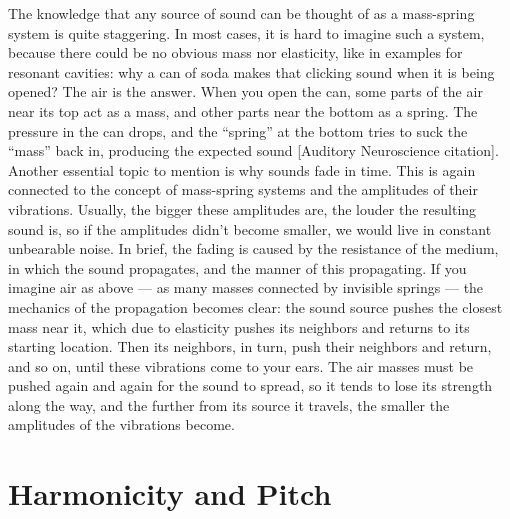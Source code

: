 The knowledge that any source of sound can be thought of as a mass-spring system is quite staggering. In most cases, it is hard to imagine such a system, because there could be no obvious mass nor elasticity, like in examples for resonant cavities: why a can of soda makes that clicking sound when it is being opened? The air is the answer. When you open the can, some parts of the air near its top act as a mass, and other parts near the bottom as a spring. The pressure in the can drops, and the “spring” at the bottom tries to suck the “mass” back in, producing the expected sound [Auditory Neuroscience citation].\\

Another essential topic to mention is why sounds fade in time. This is again connected to the concept of mass-spring systems and the amplitudes of their vibrations. Usually, the bigger these amplitudes are, the louder the resulting sound is, so if the amplitudes didn’t become smaller, we would live in constant unbearable noise. In brief, the fading is caused by the resistance of the medium, in which the sound propagates, and the manner of this propagating. If you imagine air as above --- as many masses connected by invisible springs --- the mechanics of the propagation becomes clear: the sound source pushes the closest mass near it, which due to elasticity pushes its neighbors and returns to its starting location. Then its neighbors, in turn, push their neighbors and return, and so on, until these vibrations come to your ears. The air masses must be pushed again and again for the sound to spread, so it tends to lose its strength along the way, and the further from its source it travels, the smaller the amplitudes of the vibrations become.\\

\section{Harmonicity and Pitch}


